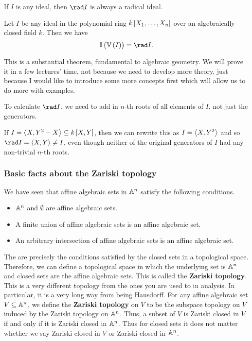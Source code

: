 \begin{note*}
If $ I $ is any ideal, then $ \rad I $ is always a radical ideal.
\end{note*}

\begin{theorem}
\label{thm:strongnullstellensatz}
Let $ I $ be any ideal in the polynomial ring $ k\sbr{X_1, \dots, X_n} $ over an algebraically closed field $ k $. Then we have
$$ \II\br{\VV\br{I}} = \rad I. $$
\end{theorem}

This is a substantial theorem, fundamental to algebraic geometry. We will prove it in a few lectures' time, not because we need to develop more theory, just because I would like to introduce some more concepts first which will allow us to do more with examples.

\begin{note*}
To calculate $ \rad I $, we need to add in $ n $-th roots of all elements of $ I $, not just the generators.
\end{note*}

\begin{example*}
If $ I = \abr{X, Y^2 - X} \subseteq k\sbr{X, Y} $, then we can rewrite this as $ I = \abr{X, Y^2} $ and so $ \rad I = \abr{X, Y} \ne I $, even though neither of the original generators of $ I $ had any non-trivial $ n $-th roots.
\end{example*}

\subsubsection{Basic facts about the Zariski topology}

We have seen that affine algebraic sets in $ \AA^n $ satisfy the following conditions.
\begin{itemize}
\item $ \AA^n $ and $ \emptyset $ are affine algebraic sets.
\item A finite union of affine algebraic sets is an affine algebraic set.
\item An arbitrary intersection of affine algebraic sets is an affine algebraic set.
\end{itemize}
The are precisely the conditions satisfied by the closed sets in a topological space. Therefore, we can define a topological space in which the underlying set is $ \AA^n $ and closed sets are the affine algebraic sets. This is called the \textbf{Zariski topology}. This is a very different topology from the ones you are used to in analysis. In particular, it is a very long way from being Hausdorff. For any affine algebraic set $ V \subseteq \AA^n $, we define the \textbf{Zariski topology} on $ V $ to be the subspace topology on $ V $ induced by the Zariski topology on $ \AA^n $. Thus, a subset of $ V $ is Zariski closed in $ V $ if and only if it is Zariski closed in $ \AA^n $. Thus for closed sets it does not matter whether we say Zariski closed in $ V $ or Zariski closed in $ \AA^n $.

